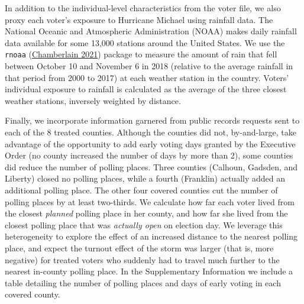\documentclass[
  12pt,
]{article}
\begin{document}
In addition to the individual-level characteristics from the voter file, we also proxy each voter's exposure to Hurricane Michael using rainfall data. The National Oceanic and Atmospheric Administration (NOAA) makes daily rainfall data available for some 13,000 stations around the United States. We use the \texttt{rnoaa} (\protect\hyperlink{ref-Chamberlain2021}{Chamberlain 2021}) package to measure the amount of rain that fell between October 10 and November 6 in 2018 (relative to the average rainfall in that period from 2000 to 2017) at each weather station in the country. Voters' individual exposure to rainfall is calculated as the average of the three closest weather stations, inversely weighted by distance.

Finally, we incorporate information garnered from public records requests sent to each of the 8 treated counties. Although the counties did not, by-and-large, take advantage of the opportunity to add early voting days granted by the Executive Order (no county increased the number of days by more than 2), some counties did reduce the number of polling places. Three counties (Calhoun, Gadsden, and Liberty) closed no polling places, while a fourth (Franklin) actually added an additional polling place. The other four covered counties cut the number of polling places by at least two-thirds. We calculate how far each voter lived from the closest \emph{planned} polling place in her county, and how far she lived from the closest polling place that was \emph{actually open} on election day. We leverage this heterogeneity to explore the effect of an increased distance to the nearest polling place, and expect the turnout effect of the storm was larger (that is, more negative) for treated voters who suddenly had to travel much further to the nearest in-county polling place. In the Supplementary Information we include a table detailing the number of polling places and days of early voting in each covered county.
\end{document}
